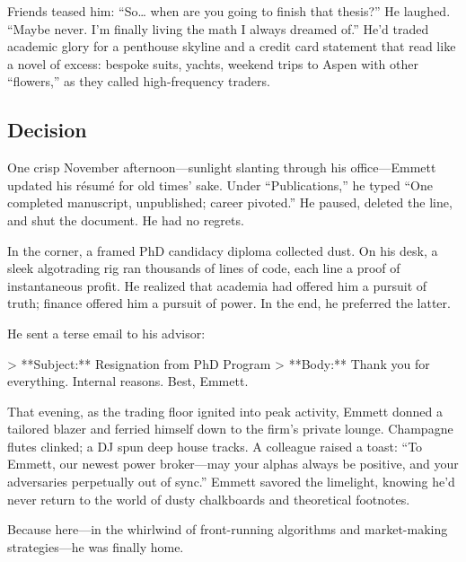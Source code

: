 Friends teased him: “So… when are you going to finish that thesis?” He laughed. “Maybe never. I’m finally living 
the math I always dreamed of.” He’d traded academic glory for a penthouse skyline and a credit card statement 
that read like a novel of excess: bespoke suits, yachts, weekend trips to Aspen with other “flowers,” as they 
called high-frequency traders.

\subsection{Decision}

One crisp November afternoon—sunlight slanting through his office—Emmett updated his résumé for old times’ sake. 
Under “Publications,” he typed “One completed manuscript, unpublished; career pivoted.” He paused, deleted the 
line, and shut the document. He had no regrets.

In the corner, a framed PhD candidacy diploma collected dust. On his desk, a sleek algotrading rig ran thousands 
of lines of code, each line a proof of instantaneous profit. He realized that academia had offered him a pursuit 
of truth; finance offered him a pursuit of power. In the end, he preferred the latter.

He sent a terse email to his advisor:

> **Subject:** Resignation from PhD Program
> **Body:** Thank you for everything. Internal reasons. Best, Emmett.

That evening, as the trading floor ignited into peak activity, Emmett donned a tailored blazer and ferried himself 
down to the firm’s private lounge. Champagne flutes clinked; a DJ spun deep house tracks. A colleague raised a 
toast: “To Emmett, our newest power broker—may your alphas always be positive, and your adversaries perpetually out 
of sync.” Emmett savored the limelight, knowing he’d never return to the world of dusty chalkboards and theoretical 
footnotes.

Because here—in the whirlwind of front-running algorithms and market-making strategies—he was finally home.

